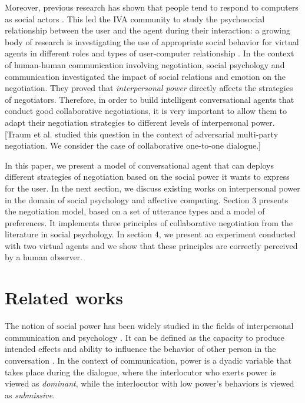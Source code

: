 \documentclass{llncs}
\begin{document}
	Moreover, previous research has shown that people tend to respond to computers as social actors \cite{bickmore2005establishing}. This led the IVA community to study the psychosocial relationship between the user and the agent during their interaction: a growing body of research is investigating the use of appropriate social behavior for virtual agents in different roles and types of user-computer relationship \cite{bickmore2005s,bickmore2005establishing,kidd2005sociable}. In the context of human-human communication involving negotiation, social psychology and communication \cite{dunbar2005perceptions,de1995impact} investigated the impact of social relations and emotion on the negotiation. They proved that  \emph{interpersonal power} directly affects the strategies of negotiators. Therefore, in order to build intelligent conversational agents that conduct good collaborative negotiations, it is very important to allow them to adapt their negotiation strategies to different levels of interpersonal power. [Traum et al. studied this question in the context of adversarial multi-party negotiation. We consider the case of collaborative one-to-one dialogue.]
	
	In this paper, we present a model of conversational agent that can deploys different strategies of negotiation based on the social power it wants to express for the user. In the next section, we discuss existing works on interpersonal power in the domain of social psychology and affective computing. Section 3 presents the negotiation model, based on a set of utterance types and a model of preferences. It implements three principles of collaborative negotiation from the literature in social psychology. In section 4, we present an experiment conducted with two virtual agents and we show that these principles are correctly perceived by a human observer.	
	
	\section{Related works}
	The notion of social power has been widely studied in the fields of interpersonal communication and psychology \cite{kecskes2013research}. It can be defined as the capacity to produce intended effects and ability to influence the behavior of other person in the conversation \cite{dunbar2005perceptions}. In the context of communication, power is a dyadic variable that takes place during the dialogue, where the interlocutor who exerts power is viewed as \textit{dominant}, while the interlocutor with low power's behaviors is viewed as \textit{submissive}. 
\end{document}
